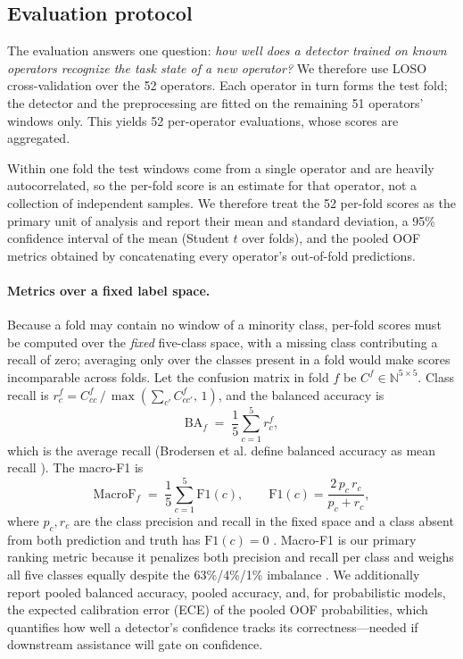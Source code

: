 \documentclass{llncs}
\begin{document}
\subsection{Evaluation protocol}
\label{sec:protocol}

The evaluation answers one question: \emph{how well does a detector trained on known
operators recognize the task state of a new operator?} We therefore use \ac{LOSO}
cross-validation over the 52 operators. Each operator in turn forms the test fold;
the detector and the preprocessing are fitted on the remaining 51 operators' windows
only. This yields 52 per-operator evaluations, whose scores are aggregated.

Within one fold the test windows come from a single operator and are heavily
autocorrelated, so the per-fold score is an estimate for that operator, not a
collection of independent samples. We therefore treat the 52 per-fold scores as the
primary unit of analysis and report their mean and standard deviation, a 95\%
confidence interval of the mean (Student $t$ over folds), and the pooled
\ac{OOF} metrics obtained by concatenating every operator's out-of-fold predictions.

\paragraph{Metrics over a fixed label space.}
Because a fold may contain no window of a minority class, per-fold scores must be
computed over the \emph{fixed} five-class space, with a missing class contributing a
recall of zero; averaging only over the classes present in a fold would make scores
incomparable across folds. Let the confusion matrix in fold $f$ be $C^f \in
\mathbb{N}^{5\times5}$. Class recall is
$r^f_c = C^f_{cc}\,/\,\max(\sum_{c'} C^f_{cc'},\,1)$,
and the balanced accuracy is
\begin{equation}
\mathrm{BA}_f \;=\; \frac{1}{5}\sum_{c=1}^{5} r^f_c,
\label{eq:ba}
\end{equation}
which is the average recall (Brodersen et al. define balanced accuracy as mean
recall \cite{brodersen2010balanced}). The macro-F1 is
\begin{equation}
\mathrm{MacroF}_f \;=\; \frac{1}{5}\sum_{c=1}^{5} \mathrm{F1}(c),
\qquad
\mathrm{F1}(c)=\frac{2\,p_c\,r_c}{p_c+r_c},
\label{eq:macro}
\end{equation}
where $p_c,r_c$ are the class precision and recall in the fixed space and a class
absent from both prediction and truth has $\mathrm{F1}(c)=0$ \cite{sokolova2009systematic}.
Macro-F1 is our primary ranking metric because it penalizes both precision and recall
per class and weighs all five classes equally despite the 63\%/4\%/1\% imbalance
\cite{jeni2013imbalanced}. We additionally report pooled balanced accuracy, pooled
accuracy, and, for probabilistic models, the expected calibration error (ECE)
\cite{guo2017calibration} of the pooled \ac{OOF} probabilities, which quantifies how
well a detector's confidence tracks its correctness---needed if downstream assistance
will gate on confidence.
\end{document}
